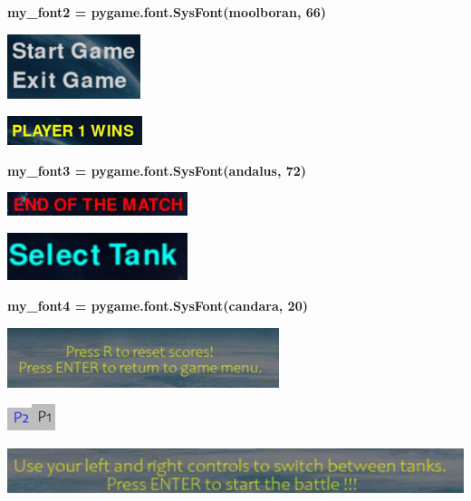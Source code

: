 \documentclass[a4paper]{article}
\begin{document}
\textbf{my\_font2 =
pygame.font.SysFont(\textquotesingle moolboran\textquotesingle, 66)}

\includegraphics[width=1.53472in,height=0.74861in]{image63.png}

\includegraphics[width=1.55139in,height=0.33333in]{image64.png}

\textbf{my\_font3 =
pygame.font.SysFont(\textquotesingle andalus\textquotesingle, 72)}

\includegraphics[width=2.07222in,height=0.27083in]{image65.png}

\includegraphics[width=2.06944in,height=0.54722in]{image66.png}

\textbf{my\_font4 =
pygame.font.SysFont(\textquotesingle candara\textquotesingle, 20)}

\includegraphics[width=3.12361in,height=0.6875in]{image67.png}

\includegraphics[width=0.28056in,height=0.26111in]{image68.png}\includegraphics[width=0.26944in,height=0.30139in]{image69.png}

\includegraphics[width=5.49861in,height=0.55278in]{image70.png}
\end{document}
